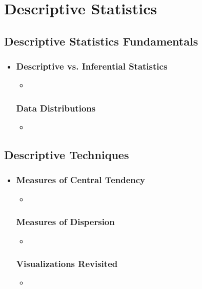 \chapter{Descriptive Statistics}

\section{Descriptive Statistics Fundamentals}
\begin{itemize}
  \item[]

  \subsection{Descriptive vs. Inferential Statistics}
  \begin{itemize}
    \item 
  \end{itemize}
  
  \subsection{Data Distributions}
  \begin{itemize}
    \item 
  \end{itemize}
  
\end{itemize}

\section{Descriptive Techniques}
\begin{itemize}
  \item[]

  \subsection{Measures of Central Tendency}
  \begin{itemize}
    \item 
  \end{itemize}

  \subsection{Measures of Dispersion}
  \begin{itemize}
    \item 
  \end{itemize}

  \subsection{Visualizations Revisited}
  \begin{itemize}
    \item 
  \end{itemize}
  
\end{itemize}
